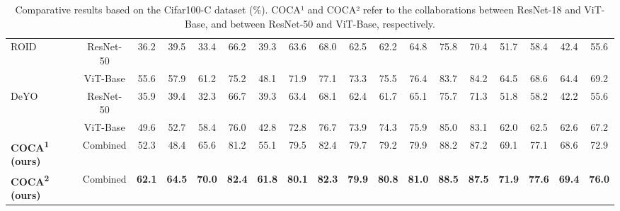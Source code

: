 \begin{table}[t]
{\begin{tabular}{lccccccccccccccccc}
\multicolumn{1}{l|}{\multirow{2}{*}{ROID~\cite{marsden2024universal2}}} & \multicolumn{1}{c|}{ResNet-50} & 36.2 & 39.5 & \multicolumn{1}{c|}{33.4} & 66.2 & 39.3 & 63.6 & \multicolumn{1}{c|}{68.0} & 62.5 & 62.2 & 64.8 & \multicolumn{1}{c|}{75.8} & 70.4 & 51.7 & 58.4 & \multicolumn{1}{c|}{42.4} & 55.6 \\
\multicolumn{1}{l|}{} & \multicolumn{1}{c|}{ViT-Base} & 55.6 & 57.9 & \multicolumn{1}{c|}{61.2} & 75.2 & 48.1 & 71.9 & \multicolumn{1}{c|}{77.1} & 73.3 & 75.5 & 76.4 & \multicolumn{1}{c|}{83.7} & 84.2 & 64.5 & 68.6 & \multicolumn{1}{c|}{64.4} & 69.2 \\ \midrule
\multicolumn{1}{l|}{\multirow{2}{*}{DeYO~\cite{lee2024entropy}}} & \multicolumn{1}{c|}{ResNet-50} & 35.9 & 39.4 & \multicolumn{1}{c|}{32.3} & 66.7 & 39.3 & 63.4 & \multicolumn{1}{c|}{68.1} & 62.4 & 61.7 & 65.1 & \multicolumn{1}{c|}{75.7} & 71.3 & 51.8 & 58.2 & \multicolumn{1}{c|}{42.2} & 55.6 \\
\multicolumn{1}{l|}{} & \multicolumn{1}{c|}{ViT-Base} & 49.6 & 52.7 & \multicolumn{1}{c|}{58.4} & 76.0 & 42.8 & 72.8 & \multicolumn{1}{c|}{76.7} & 73.9 & 74.3 & 75.9 & \multicolumn{1}{c|}{85.0} & 83.1 & 62.0 & 62.5 & \multicolumn{1}{c|}{62.6} & 67.2 \\ \midrule
\multicolumn{1}{l|}{\textbf{COCA\textsuperscript{1} (ours)}} & \multicolumn{1}{c|}{Combined} & 52.3 & 48.4 & \multicolumn{1}{c|}{65.6} & 81.2 & 55.1 & 79.5 & \multicolumn{1}{c|}{82.4} & 79.7 & 79.2 & 79.9 & \multicolumn{1}{c|}{88.2} & 87.2 & 69.1 & 77.1 & \multicolumn{1}{c|}{68.6} & 72.9 \\
\multicolumn{1}{l|}{\textbf{COCA\textsuperscript{2} (ours)}} & \multicolumn{1}{c|}{Combined} & \textbf{62.1} & \textbf{64.5} & \multicolumn{1}{c|}{\textbf{70.0}} & \textbf{82.4} & \textbf{61.8} & \textbf{80.1} & \multicolumn{1}{c|}{\textbf{82.3}} & \textbf{79.9} & \textbf{80.8} & \textbf{81.0} & \multicolumn{1}{c|}{\textbf{88.5}} & \textbf{87.5} & \textbf{71.9} & \textbf{77.6} & \multicolumn{1}{c|}{\textbf{69.4}} & \textbf{76.0}\\ \midrule
\end{tabular}
}
\vspace{-0.1in}
    \caption{Comparative results based on the Cifar100-C dataset (\%). COCA¹ and COCA² refer to the collaborations between ResNet-18 and ViT-Base, and between ResNet-50 and ViT-Base, respectively.}
    \label{cifar100c}

\end{table}

